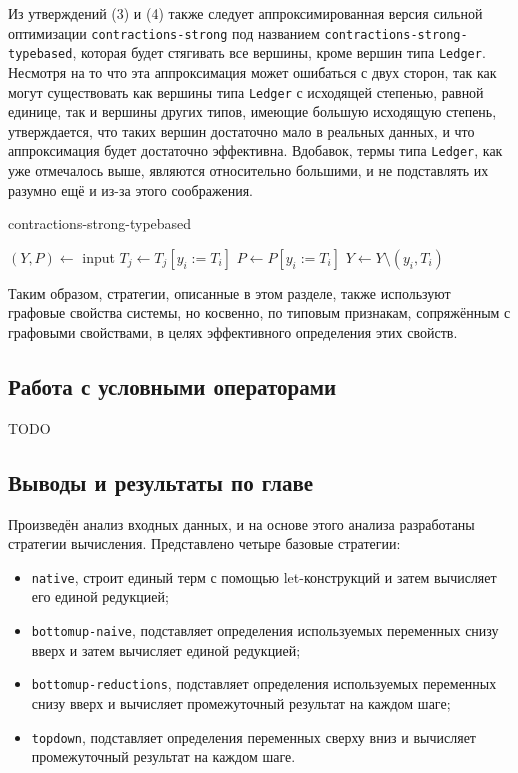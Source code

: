 \documentclass[../diploma.tex]{subfiles}
\begin{document}
Из утверждений (3) и (4) также следует аппроксимированная версия сильной оптимизации \texttt{contractions-strong} под названием \texttt{contractions-strong-typebased}, которая будет стягивать все вершины, кроме вершин типа \texttt{Ledger}. Несмотря на то что эта аппроксимация может ошибаться с двух сторон, так как могут существовать как вершины типа \texttt{Ledger} с исходящей степенью, равной единице, так и вершины других типов, имеющие большую исходящую степень, утверждается, что таких вершин достаточно мало в реальных данных, и что аппроксимация будет достаточно эффективна. Вдобавок, термы типа \texttt{Ledger}, как уже отмечалось выше, являются относительно большими, и не подставлять их разумно ещё и из-за этого соображения.

\begin{megaalgorithm}
    \caption{contractions-strong-typebased}
  \begin{algorithmic}
    \State $(Y, P)\gets$ input
        \If{\textcolor{red}{$typeof(y_i)$ is not $Ledger$}}
                \State $T_j \gets T_j [y_i := T_i]$
            \EndFor
            \State $P \gets P [y_i := T_i]$
            \State $Y\gets Y \setminus (y_i, T_i)$
        \EndIf
    \EndFor
    \State {}
  \end{algorithmic}
\end{megaalgorithm}

Таким образом, стратегии, описанные в этом разделе, также используют графовые свойства системы, но косвенно, по типовым признакам, сопряжённым с графовыми свойствами, в целях эффективного определения этих свойств. 

\subsection{Работа с условными операторами}

TODO

\subsection{Выводы и результаты по главе}

Произведён анализ входных данных, и на основе этого анализа разработаны стратегии вычисления. Представлено четыре базовые стратегии:
\begin{itemize}
    \item \texttt{native}, строит единый терм с помощью let-конструкций и затем вычисляет его единой редукцией;
    \item \texttt{bottomup-naive}, подставляет определения используемых переменных снизу вверх и затем вычисляет единой редукцией;
    \item \texttt{bottomup-reductions}, подставляет определения используемых переменных снизу вверх и вычисляет промежуточный результат на каждом шаге;
    \item \texttt{topdown}, подставляет определения переменных сверху вниз и вычисляет промежуточный результат на каждом шаге.
\end{itemize}
\end{document}
